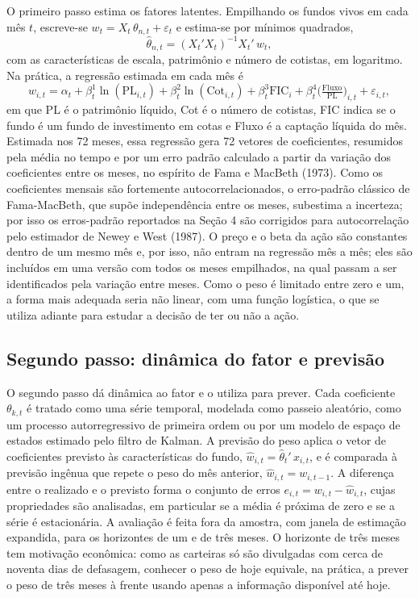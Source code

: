 \documentclass[12pt,a4paper]{article}
\begin{document}
O primeiro passo estima os fatores latentes. Empilhando os fundos vivos em cada mês $t$,
escreve-se $w_t = X_t\,\theta_{n,t} + \varepsilon_t$ e estima-se por mínimos quadrados,
\begin{equation}
\widehat{\theta}_{n,t} = (X_t'X_t)^{-1} X_t'\,w_t,
\label{eq:ols}
\end{equation}
com as características de escala, patrimônio e número de cotistas, em logaritmo. Na prática, a
regressão estimada em cada mês é
\begin{equation}
w_{i,t} = \alpha_t + \beta^{1}_t \ln(\text{PL}_{i,t}) + \beta^{2}_t \ln(\text{Cot}_{i,t})
        + \beta^{3}_t \text{FIC}_i + \beta^{4}_t \Big(\tfrac{\text{Fluxo}}{\text{PL}}\Big)_{i,t}
        + \varepsilon_{i,t},
\label{eq:cs}
\end{equation}
em que PL é o patrimônio líquido, Cot é o número de cotistas, FIC indica se o fundo é um
fundo de investimento em cotas e Fluxo é a captação líquida do mês. Estimada nos 72 meses,
essa regressão gera 72 vetores de coeficientes, resumidos pela média no tempo e por um erro
padrão calculado a partir da variação dos coeficientes entre os meses, no espírito de Fama e
MacBeth (1973). Como os coeficientes mensais são fortemente autocorrelacionados, o erro-padrão
clássico de Fama-MacBeth, que supõe independência entre os meses, subestima a incerteza; por
isso os erros-padrão reportados na Seção 4 são corrigidos para autocorrelação pelo estimador de
Newey e West (1987). O preço e o beta da ação são constantes dentro de um mesmo mês e, por isso,
não entram na regressão mês a mês; eles são incluídos em uma versão com todos os meses
empilhados, na qual passam a ser identificados pela variação entre meses. Como o peso é
limitado entre zero e um, a forma mais adequada seria não linear, com uma função logística, o
que se utiliza adiante para estudar a decisão de ter ou não a ação.

\subsection{Segundo passo: dinâmica do fator e previsão}

O segundo passo dá dinâmica ao fator e o utiliza para prever. Cada coeficiente
$\theta_{k,t}$ é tratado como uma série temporal, modelada como passeio aleatório, como um
processo autorregressivo de primeira ordem ou por um modelo de espaço de estados estimado
pelo filtro de Kalman. A previsão do peso aplica o vetor de coeficientes previsto às
características do fundo, $\widehat{w}_{i,t} = \widehat{\theta}_t'\,x_{i,t}$, e é comparada à
previsão ingênua que repete o peso do mês anterior, $\widehat{w}_{i,t}=w_{i,t-1}$. A diferença
entre o realizado e o previsto forma o conjunto de erros $e_{i,t}=w_{i,t}-\widehat{w}_{i,t}$,
cujas propriedades são analisadas, em particular se a média é próxima de zero e se a série é
estacionária. A avaliação é feita fora da amostra, com janela de estimação expandida, para os
horizontes de um e de três meses. O horizonte de três meses tem motivação econômica: como as
carteiras só são divulgadas com cerca de noventa dias de defasagem, conhecer o peso de hoje
equivale, na prática, a prever o peso de três meses à frente usando apenas a informação
disponível até hoje.
\end{document}
